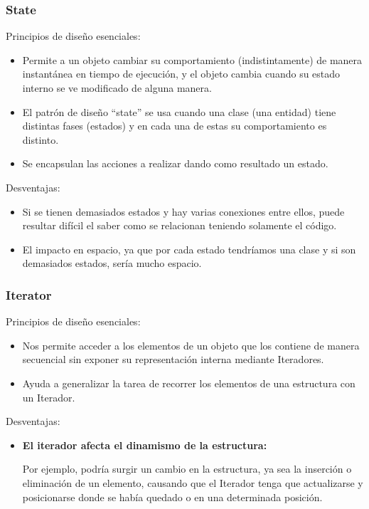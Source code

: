 \documentclass{article}
\begin{document}
\subsubsection*{State}
Principios de diseño esenciales:
\begin{itemize}
\item Permite a un objeto cambiar su comportamiento (indistintamente) de manera instantánea
  en tiempo de ejecución, y el objeto cambia cuando su estado interno se ve modificado de
  alguna manera.
\item El patrón de diseño “state” se usa cuando una clase (una entidad) tiene distintas fases
  (estados) y en cada una de estas su comportamiento es distinto.
\item Se encapsulan las acciones a realizar dando como resultado un estado.
\end{itemize}

Desventajas:
\begin{itemize}
\item Si se tienen demasiados estados y hay varias conexiones entre ellos, puede
  resultar difícil el saber como se relacionan teniendo solamente el código.
\item El impacto en espacio, ya que por cada estado tendríamos una clase y si son
  demasiados estados, sería mucho espacio.
\end{itemize}

\subsubsection*{Iterator}
Principios de diseño esenciales:
\begin{itemize}
\item Nos permite acceder a los elementos de un objeto que los contiene de manera
  secuencial sin exponer su representación interna mediante Iteradores.
\item Ayuda a generalizar la tarea de recorrer los elementos de una estructura con un Iterador.
\end{itemize}

Desventajas:
\begin{itemize}
\item \textbf{El iterador afecta el dinamismo de la estructura:}
  
  Por ejemplo, podría surgir un cambio en la estructura, ya sea la inserción
  o eliminación de un elemento, causando que el Iterador tenga que actualizarse
  y posicionarse donde se había quedado o en una determinada posición.
\end{itemize}
\end{document}
